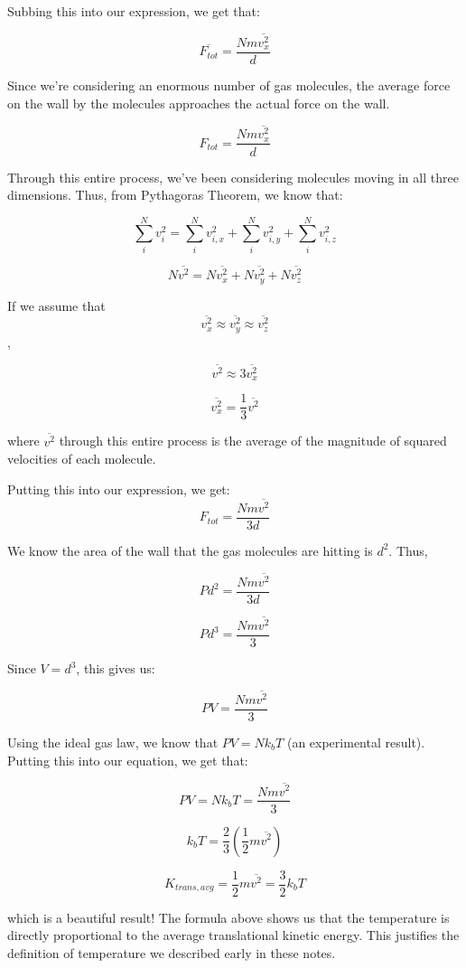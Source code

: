 \documentclass{report}
\begin{document}
Subbing this into our expression, we get that:

 
$$\overline{F_{tot}} = \frac{Nm\overline{v_x^2}}{d}$$


Since we're considering an enormous number of gas molecules, the average force on the wall by the molecules approaches the actual force on the wall.

$$\boxed{F_{tot} = \frac{Nm\overline{v_x^2}}{d}}$$

Through this entire process, we've been considering molecules moving in all three dimensions. Thus, from Pythagoras Theorem, we know that:

$$\sum_i^N v_i^2 = \sum_i^N v_{i,x}^2  + \sum_i^N v_{i,y}^2 + \sum_i^N v_{i,z}^2$$ 

$$N\overline{v^2} = N\overline{v_x^2} + N\overline{v_y^2}+N\overline{v_z^2}$$

If we assume that $$\overline{v_x^2} \approx \overline{v_y^2} \approx \overline{v_z^2}$$,

$$\overline{v^2} \approx 3\overline{v_x^2}$$

$$\overline{v_x^2} = \frac{1}{3}\overline{v^2}$$

where $\overline{v^2}$ through this entire process is the average of the magnitude of squared velocities of each molecule. 

Putting this into our expression, we get:
$$F_{tot} = \frac{Nm\overline{v^2}}{3d}$$

We know the area of the wall that the gas molecules are hitting is $d^2$. Thus,

$$Pd^2 = \frac{Nm\overline{v^2}}{3d}$$

$$Pd^3 = \frac{Nm\overline{v^2}}{3}$$

Since $V = d^3$, this gives us:

$$\boxed{PV = \frac{Nm\overline{v^2}}{3}}$$

Using the ideal gas law, we know that $PV = Nk_bT$ (an experimental result). Putting this into our equation, we get that:

$$PV = Nk_bT = \frac{Nm\overline{v^2}}{3}$$

$$k_bT = \frac{2}{3} (\frac{1}{2}m\overline{v^2})$$

$$\boxed{K_{trans, avg} = \frac{1}{2}m\overline{v^2} = \frac{3}{2}k_bT}$$


which is a beautiful result! The formula above shows us that the temperature is directly proportional to the average translational kinetic energy. This justifies the definition of temperature we described early in these notes.
\end{document}
